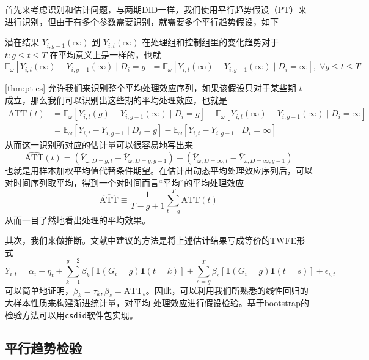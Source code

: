 \documentclass[../didNotes.tex]{subfiles}
\begin{document}
首先来考虑识别和估计问题，与两期DID一样，我们使用平行趋势假设（PT）来进行识别，但由于有多个参数需要识别，就需要多个平行趋势假设，如下
\begin{assumption}[PT-ES]\label{thm:pt-es}
  潜在结果 $Y_{i,g-1}(\infty)$ 到 $Y_{i,t}(\infty)$ 在处理组和控制组里的变化趋势对于 $t:g\le t\le T$ 在平均意义上是一样的，也就
  $$
  \mathbb{E}_{\omega}[Y_{i,t}(\infty) -Y_{i,g-1}(\infty) \mid D_i=g] =
  \mathbb{E}_{\omega}[Y_{i,t}(\infty) - Y_{i,g-1}(\infty) \mid D_i=\infty], \; \forall g \le t \le T
  $$
\end{assumption}
\autoref{thm:pt-es} 允许我们来识别整个平均处理效应序列，如果该假设只对于某些期 $t$ 成立，那么我们可以识别出这些期的平均处理效应，也就是
\begin{align*}
  \text{ATT}(t) & = \mathbb{E}_{\omega}[Y_{i,t}(g)-Y_{i,g-1}(\infty) \mid D_{i}=g] -
  \mathbb{E}_{\omega}[Y_{i,t}(\infty)-Y_{i,g-1}(\infty) \mid D_{i}=\infty]           \\
  & = \mathbb{E}_{\omega}[Y_{i,t}-Y_{i,g-1} \mid D_{i}=g] -
  \mathbb{E}_{\omega}[Y_{i,t}-Y_{i,g-1} \mid D_{i}=\infty]
\end{align*}
从而这一识别所对应的估计量可以很容易地写出来
$$
\widehat{\text{ATT}}(t) = (\bar{Y}_{\omega, D=g, t}-\bar{Y}_{\omega, D=g, g-1}) -
(\bar{Y}_{\omega, D=\infty, t}-\bar{Y}_{\omega, D=\infty, g-1})
$$
也就是用样本加权平均值代替条件期望。在估计出动态平均处理效应序列后，可以对时间序列取平均，得到一个对时间而言``平均''的平均处理效应
$$
\widehat{\text{ATT}} \equiv \frac{1}{T-g+1} \sum_{t=g}^{T} \widehat{\text{ATT}}(t)
$$
从而一目了然地看出处理的平均效果。

其次，我们来做推断。文献中建议的方法是将上述估计结果写成等价的TWFE形式
$$
Y_{i,t} = \alpha_i + \eta_t + \sum_{k=1}^{g-2} \beta_k \left[ \mathbf{1}(G_i=g)
\mathbf{1}(t=k) \right] +
\sum_{s=g}^{T} \beta_s  \left[ \mathbf{1}(G_i=g) \mathbf{1}(t=s) \right] + \epsilon_{i,t}
$$
可以简单地证明，$\beta_{k}=\tau_{k},\beta_{s}=\text{ATT}_s$。因此，可以利用我们所熟悉的线性回归的大样本性质来构建渐进统计量，对平均
处理效应进行假设检验。基于bootstrap的检验方法可以用\texttt{csdid}软件包实现。%

\subsection{平行趋势检验}
\end{document}
